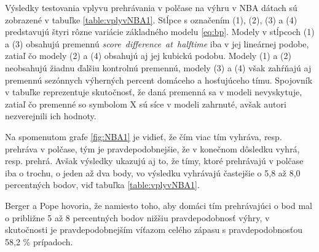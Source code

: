 \documentclass[
  digital, %
  twoside, %
  notable,   %
  lof,     %
  lot,     %
]{fithesis3}
\begin{document}
		Výsledky testovania vplyvu prehrávania v polčase na výhru v NBA dátach sú zobrazené v tabuľke \ref{table:vplyvNBA1}. Stĺpce s označením (1), (2), (3) a (4) predstavujú štyri rôzne variácie základného modelu \ref{eq:bp}. Modely v stĺpcoch (1) a (3) obsahujú premennú \textit{score~difference~at~halftime} iba v jej lineárnej podobe, zatiaľ čo modely (2) a (4) obsahujú aj jej kubickú podobu. Modely (1) a (2) neobsahujú žiadnu ďalšiu kontrolnú premennú, modely (3) a (4) však zahŕňajú aj premennú sezónnych výherných percent domáceho a hosťujúceho tímu. Spojovník v tabuľke reprezentuje skutočnosť, že daná premenná sa v modeli nevyskytuje, zatiaľ čo premenné so symbolom X sú síce v modeli zahrnuté, avšak autori nezverejnili ich hodnoty. 
		
		Na spomenutom grafe \ref{fig:NBA1} je vidieť, že čím viac tím vyhráva, resp. prehráva v polčase, tým je pravdepodobnejšie, že v konečnom dôsledku vyhrá, resp. prehrá. Avšak výsledky ukazujú aj to, že tímy, ktoré prehrávajú v polčase iba o trochu, o jeden až dva body, vo výsledku vyhrávajú častejšie o 5,8 až 8,0 percentných bodov, viď tabuľka \ref{table:vplyvNBA1}. 
		
		Berger a Pope hovoria, že namiesto toho, aby domáci tím prehrávajúci o bod mal o približne 5 až 8 percentných bodov nižšiu pravdepodobnosť výhry, v skutočnosti je pravdepodobnejším víťazom celého zápasu s pravdepodobnosťou 58,2 \% prípadoch.
		
\end{document}
